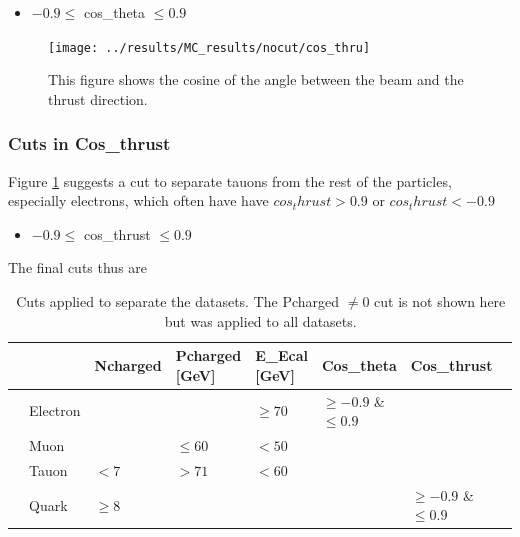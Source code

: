 \begin{itemize}
	\item{ $-0.9\le$ cos\_theta $\le0.9$}
\end{itemize}

\newpage
\begin{figure}[H]
\centering
\texttt{[image: ../results/MC\_results/nocut/cos\_thru]}
\caption[Cos\_thru in simulation data]{This figure shows the cosine of the angle between the beam and the thrust direction.}
\label{fig:cos_thru}
\end{figure}

\subsubsection{Cuts in Cos\_thrust}
Figure \ref{fig:cos_thru} suggests a cut to separate tauons from the rest of the particles, especially electrons, which often have have $cos_thrust>0.9$ or $cos_thrust<-0.9$

\begin{itemize}
	\item{ $-0.9\le$ cos\_thrust $\le0.9$}
\end{itemize}

The final cuts thus are
\begin{table}[H]\centering
	\begin{tabular}{@{}llllllll@{}}
		\toprule
		&			&Ncharged	&Pcharged [GeV]	&E\_Ecal [GeV] &Cos\_theta				&Cos\_thrust\\ 
		\midrule
		&Electron	&			&				&$\ge70$		&$\ge-0.9$ \& $\le0.9$	&\\
		&Muon		&			&$\le60$		&$<50$			&						&\\
		&Tauon		&$<7$		&$>71$			&$<60$			&						&\\
		&Quark		&$\ge8$		&				&				&						&$\ge-0.9$ \& $\le0.9$	\\
		\bottomrule
	\end{tabular}
	\caption[Table of cuts]{Cuts applied to separate the datasets. The Pcharged $\ne0$ cut is not shown here but was applied to all datasets.}
\end{table}

